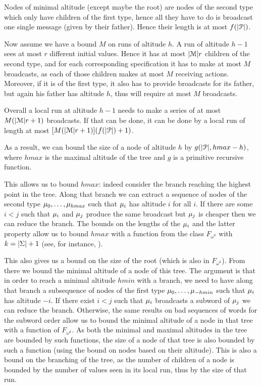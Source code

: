  Nodes of minimal altitude (except maybe the root) are nodes of the second type which only have children of the first type, hence all they have to do is broadcast one single message (given by their father). Hence their length is at most $f(|\mathcal{P}|)$. 
 
 Now assume we have a bound $M$ on runs of altitude $h$. A run of altitude $h-1$ sees at most $r$ different initial values. Hence it has at most $|\mathcal{M}|r$ children of the second type, and for each corresponding specification it has to make at most $M$ broadcasts, as each of those children makes at most $M$ receiving actions.
 Moreover, if it is of the first type, it also has to provide broadcasts for its father, but again his father has altitude $h$, thus will require at most $M$ broadcasts.
 
 Overall a local run at altitude $h-1$ needs to make a series of at most $M(|\mathcal{M}| r +1)$ broadcasts. If that can be done, it can be done by a local run of length at most $[M(|\mathcal{M}| r +1)](f(|\mathcal{P}|)+1)$.
 
 As a result, we can bound the size of a node of altitude $h$ by $g(|\mathcal{P}|, hmax-h)$, where $hmax$ is the maximal altitude of the tree and $g$ is a primitive recursive function.
 
 This allows us to bound $hmax$: indeed consider the branch reaching the highest point in the tree. Along that branch we can extract a sequence of nodes of the second type $\mu_0, \ldots, \mu_{hmax}$ such that $\mu_i$ has altitude $i$ for all $i$. If there are some $i<j$ such that $\mu_i$ and $\mu_j$ produce the same broadcast but $\mu_j$ is cheaper then we can reduce the branch.
 The bounds on the lengths of the $\mu_i$ and the latter property allow us to bound $hmax$ with a function from the class $F_{\omega^k}$ with $k = |\Sigma| +1$ (see, for instance, \cite{SchmitzS2011upperHigman}).
 
 This also gives us a bound on the size of the root (which is also in $F_{\omega^k}$). From there we bound the minimal altitude of a node of this tree. The argument is that in order to reach a minimal altitude $hmin$ with a branch, we need to have along that branch a subsequence of nodes of the first type $\mu_0, \ldots, \mu_{-hmin}$ such that $\mu_i$ has altitude $-i$. If there exist $i<j$ such that $\mu_i$ broadcasts a subword of $\mu_j$ we can reduce the branch. Otherwise, the same results on bad sequences of words  for the subword order allow us to bound the minimal altitude of a node in that tree with a function of $F_{\omega^k}$.
 As both the minimal and maximal altitudes in the tree are bounded by such functions, the size of a node of that tree is also bounded by such a function (using the bound on nodes based on their altitude). This is also a bound on the branching of the tree, as the number of children of a node is bounded by the number of values seen in its local run, thus by the size of that run.
 
